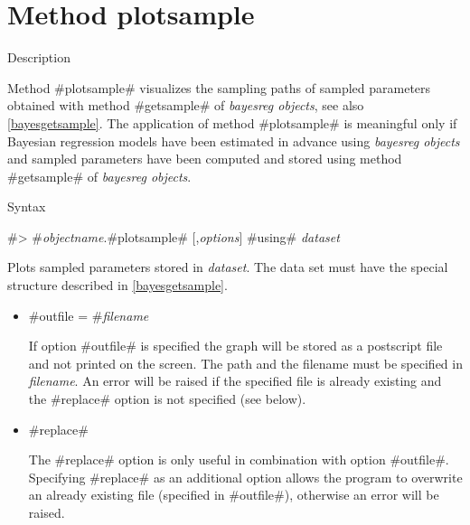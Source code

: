 \clearpage



\section{Method plotsample}
\label{graphplotsample} 
 

\begin{stanza}{Description}

{Method #plotsample# visualizes the sampling paths of sampled
parameters obtained with method #getsample# of {\em bayesreg
objects}, see also \autoref{bayesgetsample}. The application of
method #plotsample# is meaningful only if Bayesian regression
models have been estimated in advance using {\em bayesreg objects}
and sampled parameters have been computed and stored using method
#getsample# of {\em bayesreg objects}.}
\end{stanza}

\begin{stanza}{Syntax}

{#> #{\em objectname}.#plotsample# [,{\em options}] #using# {\em dataset}

Plots sampled parameters stored in {\em dataset}. The data set
must have the special structure described in
\autoref{bayesgetsample}.}
\end{stanza}


\begin{itemize}
\item #outfile = #{\em filename}

If option #outfile# is specified the graph will be stored as a
postscript file and not printed on the screen. The path and the
filename must be specified in {\em filename}. An error will be
raised if the specified file is already existing and the #replace#
option is not specified (see below).

\item #replace#

The #replace# option is only useful in combination with option
#outfile#. Specifying #replace# as an additional option allows the
program to overwrite an already existing file (specified in
#outfile#), otherwise an error will be raised.
\end{itemize}
